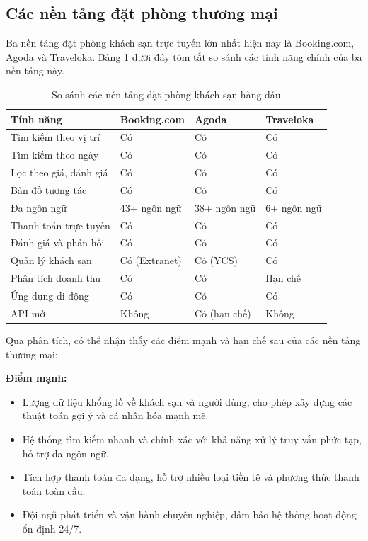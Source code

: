 \documentclass[13pt,a4paper,twoside]{report}
\begin{document}
\subsection{Các nền tảng đặt phòng thương mại}

Ba nền tảng đặt phòng khách sạn trực tuyến lớn nhất hiện nay là Booking.com, Agoda và Traveloka. Bảng \ref{tab:competitors} dưới đây tóm tắt so sánh các tính năng chính của ba nền tảng này.

\begin{table}[H]
\centering
\caption{So sánh các nền tảng đặt phòng khách sạn hàng đầu}
\label{tab:competitors}
\begin{tabularx}{\textwidth}{p{2.8cm} X X X}
\toprule
\textbf{Tính năng} & \textbf{Booking.com} & \textbf{Agoda} & \textbf{Traveloka} \\
\midrule
Tìm kiếm theo vị trí & Có & Có & Có \\
Tìm kiếm theo ngày & Có & Có & Có \\
Lọc theo giá, đánh giá & Có & Có & Có \\
Bản đồ tương tác & Có & Có & Có \\
Đa ngôn ngữ & 43+ ngôn ngữ & 38+ ngôn ngữ & 6+ ngôn ngữ \\
Thanh toán trực tuyến & Có & Có & Có \\
Đánh giá và phản hồi & Có & Có & Có \\
Quản lý khách sạn & Có (Extranet) & Có (YCS) & Có \\
Phân tích doanh thu & Có & Có & Hạn chế \\
Ứng dụng di động & Có & Có & Có \\
API mở & Không & Có (hạn chế) & Không \\
\bottomrule
\end{tabularx}
\end{table}

Qua phân tích, có thể nhận thấy các điểm mạnh và hạn chế sau của các nền tảng thương mại:

\textbf{Điểm mạnh:}
\begin{itemize}
  \item Lượng dữ liệu khổng lồ về khách sạn và người dùng, cho phép xây dựng các thuật toán gợi ý và cá nhân hóa mạnh mẽ.
  \item Hệ thống tìm kiếm nhanh và chính xác với khả năng xử lý truy vấn phức tạp, hỗ trợ đa ngôn ngữ.
  \item Tích hợp thanh toán đa dạng, hỗ trợ nhiều loại tiền tệ và phương thức thanh toán toàn cầu.
  \item Đội ngũ phát triển và vận hành chuyên nghiệp, đảm bảo hệ thống hoạt động ổn định 24/7.
\end{itemize}
\end{document}
